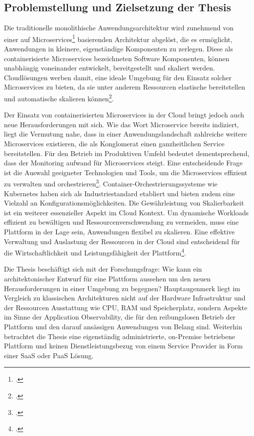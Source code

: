 \subsection{Problemstellung und Zielsetzung der Thesis}\label{lab:Problem}
Die traditionelle monolithische Anwendungsarchitektur wird zunehmend von einer auf Microservices\footcite[Vgl.][S.4]{wolff2018microservices} basierenden Architektur abgelöst, die es ermöglicht, Anwendungen in kleinere, eigenständige Komponenten zu zerlegen. Diese als containerisierte Microservices bezeichneten Software Komponenten, können unabhängig voneinander entwickelt, bereitgestellt und skaliert werden. Cloudlösungen werben damit, eine ideale Umgebung für den Einsatz solcher Microservices zu bieten, da sie unter anderem Ressourcen elastische bereitstellen und automatische skalieren können\footcite[Vgl.][S.8-19]{henneberger2016cloud}.

Der Einsatz von containerisierten Microservices in der Cloud bringt jedoch auch neue Herausforderungen mit sich. Wie das Wort Microservice bereits indiziert, liegt die Vermutung nahe, dass in einer Anwendungslandschaft zahlreiche weitere Microservices existieren, die als Konglomerat einen ganzheitlichen Service bereitstellen. Für den Betrieb im Produktiven Umfeld bedeutet dementsprechend, dass der Monitoring aufwand für Microservices steigt. Eine entscheidende Frage ist die Auswahl geeigneter Technologien und Tools, um die Microservices effizient zu verwalten und orchestrieren\footcite[Vgl.][S.12-16]{wolff2018microservices}.
Container-Orchestrierungssysteme wie Kubernetes haben sich als Industriestandard etabliert und bieten zudem eine Vielzahl an Konfigurationsmöglichkeiten. Die Gewährleistung von Skalierbarkeit ist ein weiterer essenzieller Aspekt im Cloud Kontext. Um dynamische Workloads effizient zu bewältigen und Ressourcenverschwendung zu vermeiden, muss eine \cn Plattform in der Lage sein, Anwendungen flexibel zu skalieren. Eine effektive Verwaltung und Auslastung der Ressourcen in der Cloud sind entscheidend für die Wirtschaftlichkeit und Leistungsfähigkeit der Plattform\footcite[Vgl.][o.S.]{k8s2022}.

Die Thesis beschäftigt sich mit der Forschungsfrage: \glqq Wie kann ein architektonischer Entwurf für eine \cn Plattform aussehen um den neuen Herausforderungen in einer \cn Umgebung zu begegnen\grqq? Hauptaugenmerk liegt im Vergleich zu klassischen Architekturen nicht auf der Hardware Infrastruktur und der Ressourcen Ausstattung wie \ac{CPU}, \ac{RAM} und Speicherplatz, sondern Aspekte im Sinne der Application Observability, die für den reibungslosen Betrieb der Plattform und den darauf ansässigen Anwendungen von Belang sind. Weiterhin betrachtet die Thesis eine eigenständig administrierte, on-Premise betriebene Plattform und keinen Dienstleistungsbezug von einem Service Provider in Form einer \ac{SaaS} oder \ac{PaaS} Lösung.

